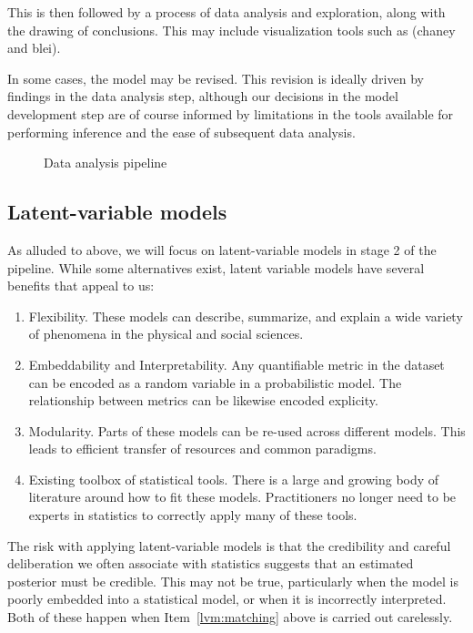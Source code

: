   This is then followed by a process of data analysis and exploration,
  along with the drawing of conclusions.  This may include
  visualization tools such as \cite{chaney:2012}(chaney and blei).

  In some cases, the model may be revised.  This revision is ideally
  driven by findings in the data analysis step, although our decisions
  in the model development step are of course informed by limitations
  in the tools available for performing inference and the ease of
  subsequent data analysis.

  \begin{figure}
    \caption{Data analysis pipeline}
    \label{figure:data_analysis_pipeline}
  \end{figure}
  
  \subsection{Latent-variable models}

  As alluded to above, we will focus on latent-variable models in
  stage 2 of the pipeline.  While some alternatives exist, latent
  variable models have several benefits that appeal to us:
  \begin{enumerate}
    \item Flexibility. These models can describe, summarize, and explain a wide
      variety of phenomena in the physical and social sciences.
    \item Embeddability and Interpretability.  Any quantifiable metric in the dataset
      can be encoded as a random variable in a probabilistic model.
      The relationship between metrics can be likewise encoded
      explicity. \label{lvm:matching}
    \item Modularity. Parts of these models can be re-used across
      different models.  This leads to efficient transfer of resources
      and common paradigms.
    \item Existing toolbox of statistical tools. There is a large and
      growing body of literature around how to fit these models.
      Practitioners no longer need to be experts in statistics to
      correctly apply many of these tools.
  \end{enumerate}

  The risk with applying latent-variable models is that the
  credibility and careful deliberation we often associate with
  statistics suggests that an estimated posterior must be
  credible.  This may not be true, particularly when the model is
  poorly embedded into a statistical model, or when it is incorrectly
  interpreted.  Both of these happen when Item~\ref{lvm:matching}
  above is carried out carelessly.

